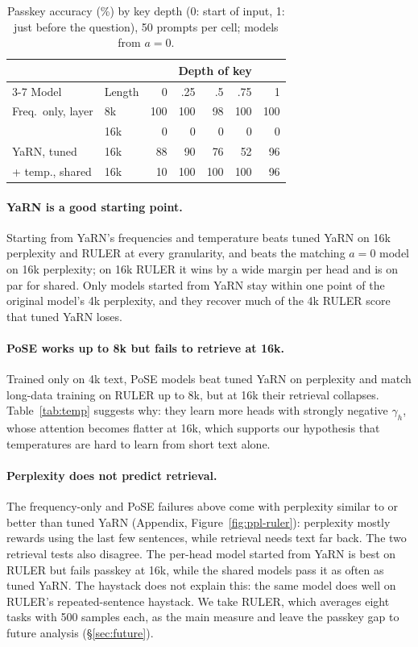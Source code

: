 \begin{table}[t]
\centering
\small
\setlength{\tabcolsep}{3.5pt}
\begin{tabular}{ll rrrrr}
\toprule
& & \multicolumn{5}{c}{Depth of key} \\
\cmidrule(lr){3-7}
Model & Length & 0 & .25 & .5 & .75 & 1 \\
\midrule
Freq.\ only, layer & 8k  & 100 & 100 & 98 & 100 & 100 \\
                   & 16k & 0 & 0 & 0 & 0 & 0 \\
YaRN, tuned        & 16k & 88 & 90 & 76 & 52 & 96 \\
+ temp., shared    & 16k & 10 & 100 & 100 & 100 & 96 \\
\bottomrule
\end{tabular}
\caption{Passkey accuracy (\%) by key depth (0: start of input, 1: just before the question), 50 prompts per cell; models from $a{=}0$.}
\label{tab:depth}
\end{table}

\paragraph{YaRN is a good starting point.}
Starting from YaRN's frequencies and temperature beats tuned YaRN on 16k perplexity and RULER at every granularity, and beats the matching $a = 0$ model on 16k perplexity; on 16k RULER it wins by a wide margin per head and is on par for shared. Only models started from YaRN stay within one point of the original model's 4k perplexity, and they recover much of the 4k RULER score that tuned YaRN loses.

\paragraph{PoSE works up to 8k but fails to retrieve at 16k.}
Trained only on 4k text, PoSE models beat tuned YaRN on perplexity and match long-data training on RULER up to 8k, but at 16k their retrieval collapses. Table~\ref{tab:temp} suggests why: they learn more heads with strongly negative $\gamma_h$, whose attention becomes flatter at 16k, which supports our hypothesis that temperatures are hard to learn from short text alone.

\paragraph{Perplexity does not predict retrieval.}
The frequency-only and PoSE failures above come with perplexity similar to or better than tuned YaRN (Appendix, Figure~\ref{fig:ppl-ruler}): perplexity mostly rewards using the last few sentences, while retrieval needs text far back. The two retrieval tests also disagree. The per-head model started from YaRN is best on RULER but fails passkey at 16k, while the shared models pass it as often as tuned YaRN. The haystack does not explain this: the same model does well on RULER's repeated-sentence haystack. We take RULER, which averages eight tasks with 500 samples each, as the main measure and leave the passkey gap to future analysis (\S\ref{sec:future}).

